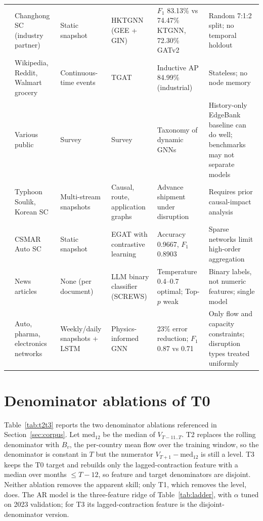 \documentclass[10pt]{article}
\begin{document}
\begin{table}[!h]
\begin{tabular}{L{1.35cm} L{1.85cm} L{1.7cm} L{1.55cm} L{2.15cm} L{2.15cm}}
\citet{ref16} & Changhong SC (industry partner) & Static snapshot & HKTGNN (GEE + GIN) & $F_1$ 83.13\% vs 74.47\% KTGNN, 72.30\% GATv2 & Random 7:1:2 split; no temporal holdout \\
\citet{ref13} & Wikipedia, Reddit, Walmart grocery & Continuous-time events & TGAT & Inductive AP 84.99\% (industrial) & Stateless; no node memory \\
\citet{ref14} & Various public & Survey & Survey & Taxonomy of dynamic GNNs & History-only EdgeBank baseline can do well; benchmarks may not separate models \\
\citet{ref17} & Typhoon Soulik, Korean SC & Multi-stream snapshots & Causal, route, application graphs & Advance shipment under disruption & Requires prior causal-impact analysis \\
\citet{ref18} & CSMAR Auto SC & Static snapshot & EGAT with contrastive learning & Accuracy 0.9667, $F_1$ 0.8903 & Sparse networks limit high-order aggregation \\
\citet{ref21} & News articles & None (per document) & LLM binary classifier (SCREWS) & Temperature 0.4--0.7 optimal; Top-$p$ weak & Binary labels, not numeric features; single model \\
\citet{ref23} & Auto, pharma, electronics networks & Weekly/daily snapshots + LSTM & Physics-informed GNN & 23\% error reduction; $F_1$ 0.87 vs 0.71 & Only flow and capacity constraints; disruption types treated uniformly \\
\bottomrule
\end{tabular}
\end{table}

\clearpage
\section{Denominator ablations of T0}
\label{app:t2t3}

Table~\ref{tab:t2t3} reports the two denominator ablations referenced in Section~\ref{sec:corpus}. Let $\mathrm{med}_{12}$ be the median of $V_{T-11..T}$. T2 replaces the rolling denominator with $B_v$, the per-country mean flow over the training window, so the denominator is constant in $T$ but the numerator $V_{T+1}-\mathrm{med}_{12}$ is still a level. T3 keeps the T0 target and rebuilds only the lagged-contraction feature with a median over months $\le T-12$, so feature and target denominators are disjoint. Neither ablation removes the apparent skill; only T1, which removes the level, does. The AR model is the three-feature ridge of Table~\ref{tab:ladder}, with $\alpha$ tuned on 2023 validation; for T3 its lagged-contraction feature is the disjoint-denominator version.
\end{document}
